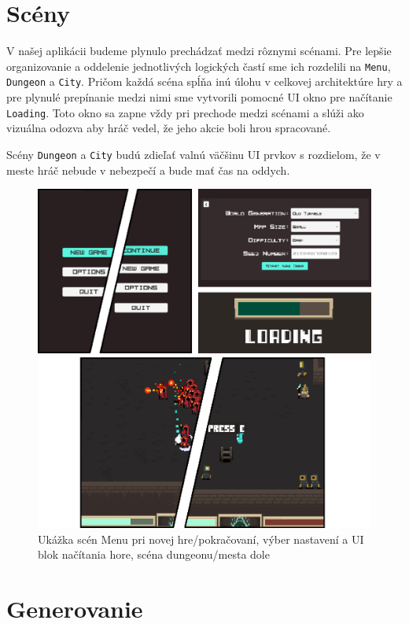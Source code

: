 \section{Scény}

V našej aplikácii budeme plynulo prechádzať medzi rôznymi scénami. Pre lepšie organizovanie a oddelenie jednotlivých logických častí sme ich rozdelili na \verb|Menu|, \verb|Dungeon| a \verb|City|. Pričom každá scéna spĺňa inú úlohu v celkovej architektúre hry a pre plynulé prepínanie medzi nimi sme vytvorili pomocné UI okno pre načítanie \verb|Loading|. Toto okno sa zapne vždy pri prechode medzi scénami a slúži ako vizuálna odozva aby hráč vedel, že jeho akcie boli hrou spracované.

Scény \verb|Dungeon| a \verb|City| budú zdieľať valnú väčšinu UI prvkov s rozdielom, že v meste hráč nebude v nebezpečí a bude mať čas na oddych.

\begin{figure}[H]
    \centering
    \includegraphics[width=1\linewidth]{obrazky-figures/screens.png}
    \caption{Ukážka scén Menu pri novej hre/pokračovaní, výber nastavení a UI blok načítania hore, scéna dungeonu/mesta dole}
    \label{fig:scenes}
\end{figure}

\section{Generovanie}

